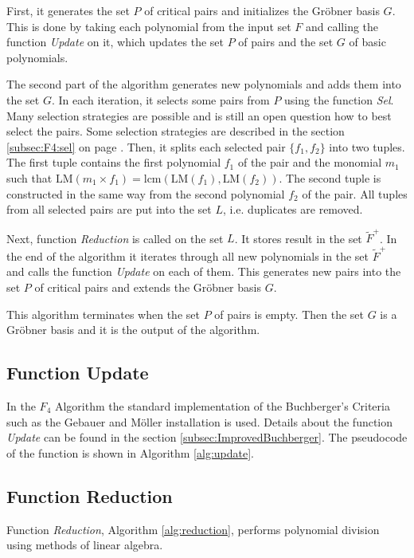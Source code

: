 First, it generates the set $P$ of critical pairs and initializes the Gr\"obner basis $G$. This is done by taking each polynomial from the input set $F$ and calling the function \textit{Update} on it, which updates the set $P$ of pairs and the set $G$ of basic polynomials.

The second part of the algorithm generates new polynomials and adds them into the set $G$. In each iteration, it selects some pairs from $P$ using the function \textit{Sel}. Many selection strategies are possible and is still an open question how to best select the pairs. Some selection strategies are described in the section \ref{subsec:F4:sel} on page \pageref{subsec:F4:sel}. Then, it splits each selected pair $\{f_1, f_2\}$ into two tuples. The first tuple contains the first polynomial $f_1$ of the pair and the monomial $m_1$ such that $\textrm{LM}(m_1 \times f_1) = \textrm{lcm}(\textrm{LM}(f_1),\textrm{LM}(f_2))$. The second tuple is constructed in the same way from the second polynomial $f_2$ of the pair. All tuples from all selected pairs are put into the set $L$, i.e. duplicates are removed.

Next, function \textit{Reduction} is called on the set $L$. It stores result in the set $\tilde{F}^+$. In the end of the algorithm it iterates through all new polynomials in the set $\tilde{F}^+$ and calls the function \textit{Update} on each of them. This generates new pairs into the set $P$ of critical pairs and extends the Gr\"obner basis $G$.

This algorithm terminates when the set $P$ of pairs is empty. Then the set $G$ is a Gr\"obner basis and it is the output of the algorithm.



\subsection{Function Update}
In the $F_4$ Algorithm the standard implementation of the Buchberger's Criteria such as the Gebauer and M\"oller installation \cite{Gebauer-Moller88} is used. Details about the function \textit{Update} can be found in the section \ref{subsec:ImprovedBuchberger}. The pseudocode of the function is shown in Algorithm \ref{alg:update}.

\subsection{Function Reduction}
Function \textit{Reduction}, Algorithm \ref{alg:reduction}, performs polynomial division using methods of linear algebra.

